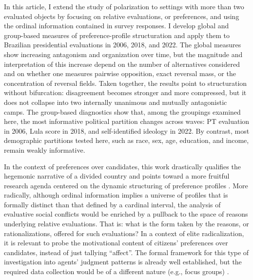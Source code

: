 \documentclass[12pt]{article}
\begin{document}
In this article, I extend the study of polarization to settings with more than
two evaluated objects by focusing on relative evaluations, or preferences, and
using the ordinal information contained in survey responses. I develop global
and group-based measures of preference-profile structuration and apply them to
Brazilian presidential evaluations in 2006, 2018, and 2022. The global measures
show increasing antagonism and organization over time, but the magnitude and
interpretation of this increase depend on the number of alternatives considered
and on whether one measures pairwise opposition, exact reversal mass, or the
concentration of reversal fields. Taken together, the results point to
structuration without bifurcation: disagreement becomes stronger and more
compressed, but it does not collapse into two internally unanimous and mutually
antagonistic camps. The group-based diagnostics show that, among the groupings
examined here, the most informative political partition changes across waves:
PT evaluation in 2006, Lula score in 2018, and self-identified ideology in
2022. By contrast, most demographic partitions tested here, such as race, sex,
age, education, and income, remain weakly informative.

In the context of preferences over candidates, this work drastically qualifies
the hegemonic narrative of a divided country and points toward a more fruitful
research agenda centered on the dynamic structuring of preference profiles
\parencite{perote-pena15_model_delib_aggreg_democ, feld1990collectivities}. More
radically, although ordinal information implies a universe of profiles that is
formally distinct than that defined by a cardinal
interval, the analysis of evaluative social conflicts would be enriched by a
pullback to the space of reasons underlying relative evaluations. That is: what
is the form taken by the reasons, or rationalizations, offered for such
evaluations? In a context of elite radicalization, it is relevant to probe the
motivational content of citizens’ preferences over candidates, instead of just
tallying ``affect''. The formal framework for this type of investigation into
agents’ judgment patterns is already well established, but the required data
collection would be of a different nature (e.g., focus groups)
\parencite{list11_theor_judgm_aggreg}.


\end{document}
